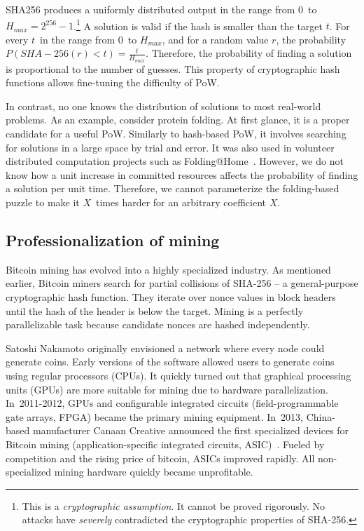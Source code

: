SHA256 produces a uniformly distributed output in the range from $0$~to $H_{max} = 2^{256}-1$.\footnote{This is a \textit{cryptographic assumption}. It cannot be proved rigorously. No attacks have \textit{severely} contradicted the cryptographic properties of SHA-256.}
A solution is valid if the hash is smaller than the target $t$.
For every $t$~in the range from $0$~to $H_{max}$, and for a random value $r$, the probability $P(SHA-256(r) < t) = \frac{t}{H_{max}}$.
Therefore, the probability of finding a solution is proportional to the number of guesses.
This property of cryptographic hash functions allows fine-tuning the difficulty of PoW.

In contrast, no one knows the distribution of solutions to most real-world problems.
As an example, consider protein folding.
At first glance, it is a proper candidate for a useful PoW.
Similarly to hash-based PoW, it involves searching for solutions in a large space by trial and error.
It was also used in volunteer distributed computation projects such as Folding@Home~\cite{Beberg2009}.
However, we do not know how a unit increase in committed resources affects the probability of finding a solution per unit time.
Therefore, we cannot parameterize the folding-based puzzle to make it $X$~times harder for an arbitrary coefficient $X$.


\subsection{Professionalization of mining}

Bitcoin mining has evolved into a highly specialized industry.
As mentioned earlier, Bitcoin miners search for partial collisions of SHA-256 -- a general-purpose cryptographic hash function.
They iterate over nonce values in block headers until the hash of the header is below the target.
Mining is a perfectly parallelizable task because candidate nonces are hashed independently.

Satoshi Nakamoto originally envisioned a network where every node could generate coins.
Early versions of the software allowed users to generate coins using regular processors (CPUs).
It quickly turned out that graphical processing units (GPUs) are more suitable for mining due to hardware parallelization.
In~2011-2012, GPUs and configurable integrated circuits (field-programmable gate arrays, FPGA) became the primary mining equipment.
In~2013, China-based manufacturer Canaan Creative announced the first specialized devices for Bitcoin mining (application-specific integrated circuits, ASIC)~\cite{Kim2020}.
Fueled by competition and the rising price of bitcoin, ASICs improved rapidly.
All non-specialized mining hardware quickly became unprofitable.

